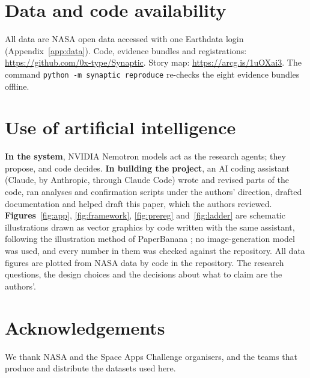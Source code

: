 \documentclass[11pt,a4paper]{article}
\begin{document}
\section*{Data and code availability}
All data are NASA open data accessed with one Earthdata login (Appendix~\ref{app:data}). Code, evidence bundles and
registrations: \url{https://github.com/0x-type/Synaptic}. Story map: \url{https://arcg.is/1uOXai3}. The command
\texttt{python -m synaptic reproduce} re-checks the eight evidence bundles offline.

\section*{Use of artificial intelligence}
\textbf{In the system}, NVIDIA Nemotron models act as the research agents; they propose, and code decides.
\textbf{In building the project}, an AI coding assistant (Claude, by Anthropic, through Claude Code) wrote and revised
parts of the code, ran analyses and confirmation scripts under the authors' direction, drafted documentation and
helped draft this paper, which the authors reviewed. \textbf{Figures}~\ref{fig:app}, \ref{fig:framework},
\ref{fig:prereg} and~\ref{fig:ladder} are schematic illustrations drawn as vector graphics by code written with the
same assistant, following the illustration method of PaperBanana \citep{zhu2026}; no image-generation model was used,
and every number in them was checked against the repository. All data figures are plotted from NASA data by code in the
repository. The research questions, the design choices and the decisions about what to claim are the authors'.

\section*{Acknowledgements}
We thank NASA and the Space Apps Challenge organisers, and the teams that produce and distribute the datasets used
here.
\end{document}
